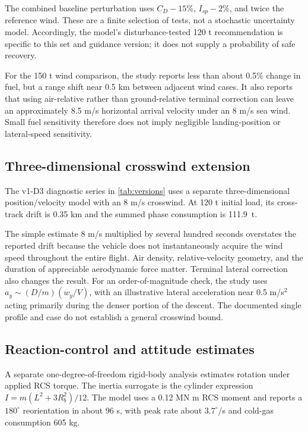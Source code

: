 \documentclass[11pt,a4paper]{article}
\begin{document}


The combined baseline perturbation uses $C_D-15\%$, $I_{sp}-2\%$, and twice the reference wind. These are a finite selection of tests, not a stochastic uncertainty model. Accordingly, the model's disturbance-tested 120 t recommendation is specific to this set and guidance version; it does not supply a probability of safe recovery.



For the 150 t wind comparison, the study reports less than about 0.5\% change in fuel, but a range shift near 0.5 km between adjacent wind cases. It also reports that using air-relative rather than ground-relative terminal correction can leave an approximately 8.5 m/s horizontal arrival velocity under an 8 m/s sea wind. Small fuel sensitivity therefore does not imply negligible landing-position or lateral-speed sensitivity.

\subsection{Three-dimensional crosswind extension}
The v1-D3 diagnostic series in \cref{tab:versions} uses a separate three-dimensional position/velocity model with an 8 m/s crosswind. At 120 t initial load, its cross-track drift is 0.35 km and the summed phase consumption is 111.9~t.



The simple estimate $8$ m/s multiplied by several hundred seconds overstates the reported drift because the vehicle does not instantaneously acquire the wind speed throughout the entire flight. Air density, relative-velocity geometry, and the duration of appreciable aerodynamic force matter. Terminal lateral correction also changes the result. For an order-of-magnitude check, the study uses $a_y\sim(D/m)(w_y/V)$, with an illustrative lateral acceleration near 0.5 m/s$^2$ acting primarily during the denser portion of the descent. The documented single profile and case do not establish a general crosswind bound.

\subsection{Reaction-control and attitude estimates}
A separate one-degree-of-freedom rigid-body analysis estimates rotation under applied RCS torque. The inertia surrogate is the cylinder expression $I=m(L^2+3R_b^2)/12$. The model uses a 0.12 MN m RCS moment and reports a $180^\circ$ reorientation in about 96 s, with peak rate about $3.7^\circ$/s and cold-gas consumption 605 kg.
\end{document}
